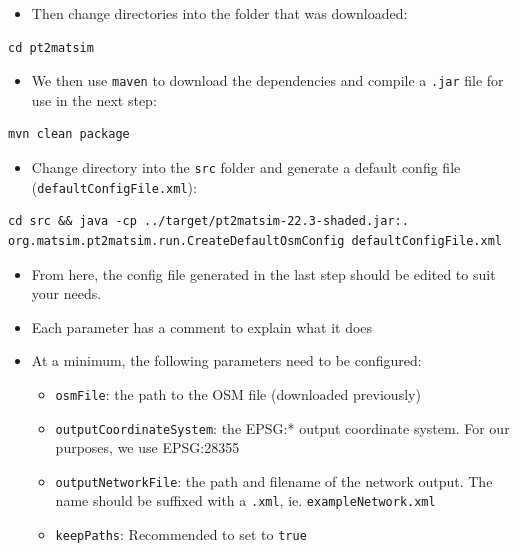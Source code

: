 \documentclass[11pt]{article}
\begin{document}
\begin{itemize}
\item Then change directories into the folder that was downloaded:
\end{itemize}
\begin{verbatim}
cd pt2matsim
\end{verbatim}

\begin{itemize}
\item We then use \texttt{maven} to download the dependencies and compile a \texttt{.jar} file for use in the next step:
\end{itemize}
\begin{verbatim}
mvn clean package
\end{verbatim}

\begin{itemize}
\item Change directory into the \texttt{src} folder and generate a default config file (\texttt{defaultConfigFile.xml}):
\end{itemize}
\begin{verbatim}
cd src && java -cp ../target/pt2matsim-22.3-shaded.jar:. org.matsim.pt2matsim.run.CreateDefaultOsmConfig defaultConfigFile.xml
\end{verbatim}

\begin{itemize}
\item From here, the config file generated in the last step should be edited to suit your needs.
\item Each parameter has a comment to explain what it does
\item At a minimum, the following parameters need to be configured:
\begin{itemize}
\item \texttt{osmFile}: the path to the OSM file (downloaded previously)
\item \texttt{outputCoordinateSystem}: the EPSG:* output coordinate system. For our purposes, we use EPSG:28355
\item \texttt{outputNetworkFile}: the path and filename of the network output. The name should be suffixed with a \texttt{.xml}, ie. \texttt{exampleNetwork.xml}
\item \texttt{keepPaths}: Recommended to set to \texttt{true}
\end{itemize}
\end{itemize}
\end{document}
